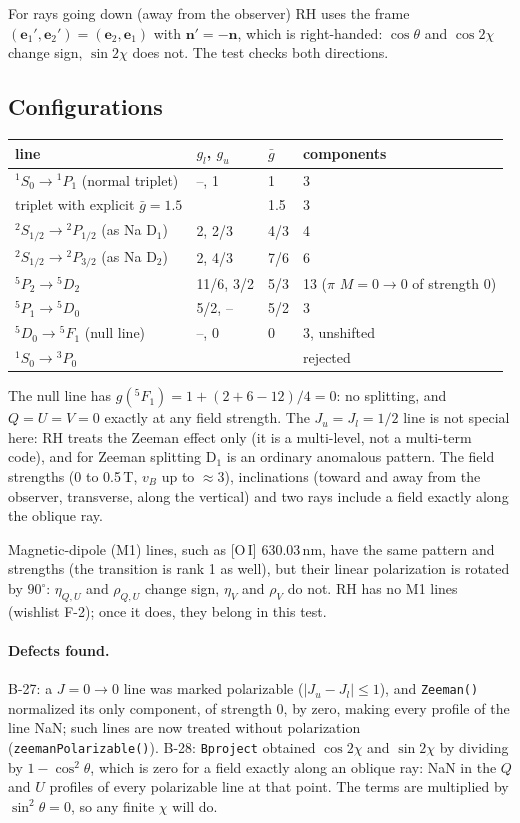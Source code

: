 \documentclass[11pt,a4paper]{article}
\newcommand{\code}[1]{\texttt{#1}}
\begin{document}
For rays going down (away from the observer) RH uses the frame
$(\boldsymbol e_1',\boldsymbol e_2') = (\boldsymbol e_2,\boldsymbol e_1)$
with $\boldsymbol n' = -\boldsymbol n$, which is right-handed: $\cos\theta$
and $\cos2\chi$ change sign, $\sin2\chi$ does not. The test checks
both directions.

\subsection{Configurations}
\begin{center}
\begin{tabular}{llll}
\toprule
line & $g_l$, $g_u$ & $\bar g$ & components\\
\midrule
$^1S_0\to{}^1P_1$ (normal triplet) & --, 1 & 1 & 3\\
triplet with explicit $\bar g = 1.5$ & & 1.5 & 3\\
$^2S_{1/2}\to{}^2P_{1/2}$ (as Na D$_1$) & 2, 2/3 & 4/3 & 4\\
$^2S_{1/2}\to{}^2P_{3/2}$ (as Na D$_2$) & 2, 4/3 & 7/6 & 6\\
$^5P_2\to{}^5D_2$ & 11/6, 3/2 & 5/3 & 13 ($\pi$ $M=0\to0$ of strength 0)\\
$^5P_1\to{}^5D_0$ & 5/2, -- & 5/2 & 3\\
$^5D_0\to{}^5F_1$ (null line) & --, 0 & 0 & 3, unshifted\\
$^1S_0\to{}^3P_0$ & & & rejected\\
\bottomrule
\end{tabular}
\end{center}
The null line has $g(^5F_1) = 1+(2+6-12)/4 = 0$: no splitting, and
$Q=U=V=0$ exactly at any field strength. The $J_u=J_l=1/2$ line is not
special here: RH treats the Zeeman effect only (it is a multi-level, not
a multi-term code), and for Zeeman splitting D$_1$ is an ordinary
anomalous pattern. The field strengths (0 to 0.5\,T, $v_B$ up to
$\approx3$), inclinations (toward and away from the observer, transverse,
along the vertical) and two rays include a field exactly along the
oblique ray.

Magnetic-dipole (M1) lines, such as [O\,I] 630.03\,nm, have the same
pattern and strengths (the transition is rank 1 as well), but their
linear polarization is rotated by $90^\circ$: $\eta_{Q,U}$ and
$\rho_{Q,U}$ change sign, $\eta_V$ and $\rho_V$ do not. RH has no M1
lines (wishlist F-2); once it does, they belong in this test.

\paragraph{Defects found.} B-27: a $J=0\to0$ line was marked polarizable
($|J_u-J_l|\le1$), and \code{Zeeman()} normalized its only component, of
strength 0, by zero, making every profile of the line NaN; such lines are
now treated without polarization (\code{zeemanPolarizable()}). B-28:
\code{Bproject} obtained $\cos2\chi$ and $\sin2\chi$ by dividing by
$1-\cos^2\theta$, which is zero for a field exactly along an oblique ray:
NaN in the $Q$ and $U$ profiles of every polarizable line at that point.
The terms are multiplied by $\sin^2\theta=0$, so any finite $\chi$ will do.
\end{document}
